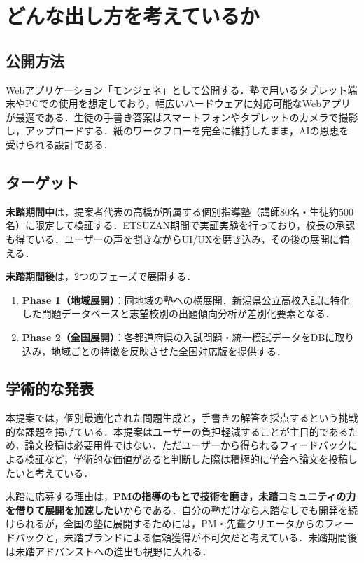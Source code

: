 \documentclass[paper=a4,fontsize=10.5bp,jafontsize=10.5bp,twocolumn]{jlreq}
\begin{document}
\section{どんな出し方を考えているか}

\subsection{公開方法}

Webアプリケーション「モンジェネ」として公開する．塾で用いるタブレット端末やPCでの使用を想定しており，幅広いハードウェアに対応可能なWebアプリが最適である．生徒の手書き答案はスマートフォンやタブレットのカメラで撮影し，アップロードする．紙のワークフローを完全に維持したまま，AIの恩恵を受けられる設計である．

\subsection{ターゲット}

\textbf{未踏期間中}は，提案者代表の高橋が所属する個別指導塾（講師80名・生徒約500名）に限定して検証する．ETSUZAN期間で実証実験を行っており，校長の承認も得ている．ユーザーの声を聞きながらUI/UXを磨き込み，その後の展開に備える．

\textbf{未踏期間後}は，2つのフェーズで展開する．

\begin{enumerate}[leftmargin=2em]
  \item \textbf{Phase 1（地域展開）}：同地域の塾への横展開．新潟県公立高校入試に特化した問題データベースと志望校別の出題傾向分析が差別化要素となる．
  \item \textbf{Phase 2（全国展開）}：各都道府県の入試問題・統一模試データをDBに取り込み，地域ごとの特徴を反映させた全国対応版を提供する．
\end{enumerate}

\subsection{学術的な発表}

本提案では，個別最適化された問題生成と，手書きの解答を採点するという挑戦的な課題を掲げている．本提案はユーザーの負担軽減することが主目的であるため，論文投稿は必要用件ではない．ただユーザーから得られるフィードバックによる検証など，学術的な価値があると判断した際は積極的に学会へ論文を投稿したいと考えている．

未踏に応募する理由は，\textbf{PMの指導のもとで技術を磨き，未踏コミュニティの力を借りて展開を加速したい}からである．自分の塾だけなら未踏なしでも開発を続けられるが，全国の塾に展開するためには，PM・先輩クリエータからのフィードバックと，未踏ブランドによる信頼獲得が不可欠だと考えている．未踏期間後は未踏アドバンストへの進出も視野に入れる．
\end{document}
